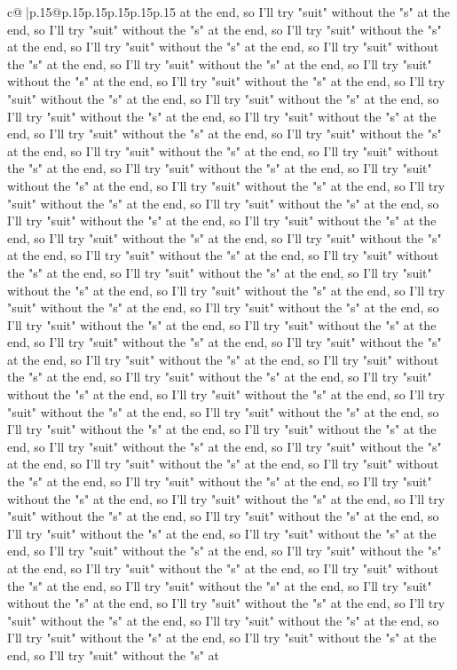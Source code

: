 \documentclass{article}
\begin{document}
{\begin{supertabular}{c@{$\;$}|p{.15\linewidth}@{}p{.15\linewidth}p{.15\linewidth}p{.15\linewidth}p{.15\linewidth}p{.15\linewidth}}
{{{at the end, so I'll try "suit" without the "s" at the end, so I'll try "suit" without the "s" at the end, so I'll try "suit" without the "s" at the end, so I'll try "suit" without the "s" at the end, so I'll try "suit" without the "s" at the end, so I'll try "suit" without the "s" at the end, so I'll try "suit" without the "s" at the end, so I'll try "suit" without the "s" at the end, so I'll try "suit" without the "s" at the end, so I'll try "suit" without the "s" at the end, so I'll try "suit" without the "s" at the end, so I'll try "suit" without the "s" at the end, so I'll try "suit" without the "s" at the end, so I'll try "suit" without the "s" at the end, so I'll try "suit" without the "s" at the end, so I'll try "suit" without the "s" at the end, so I'll try "suit" without the "s" at the end, so I'll try "suit" without the "s" at the end, so I'll try "suit" without the "s" at the end, so I'll try "suit" without the "s" at the end, so I'll try "suit" without the "s" at the end, so I'll try "suit" without the "s" at the end, so I'll try "suit" without the "s" at the end, so I'll try "suit" without the "s" at the end, so I'll try "suit" without the "s" at the end, so I'll try "suit" without the "s" at the end, so I'll try "suit" without the "s" at the end, so I'll try "suit" without the "s" at the end, so I'll try "suit" without the "s" at the end, so I'll try "suit" without the "s" at the end, so I'll try "suit" without the "s" at the end, so I'll try "suit" without the "s" at the end, so I'll try "suit" without the "s" at the end, so I'll try "suit" without the "s" at the end, so I'll try "suit" without the "s" at the end, so I'll try "suit" without the "s" at the end, so I'll try "suit" without the "s" at the end, so I'll try "suit" without the "s" at the end, so I'll try "suit" without the "s" at the end, so I'll try "suit" without the "s" at the end, so I'll try "suit" without the "s" at the end, so I'll try "suit" without the "s" at the end, so I'll try "suit" without the "s" at the end, so I'll try "suit" without the "s" at the end, so I'll try "suit" without the "s" at the end, so I'll try "suit" without the "s" at the end, so I'll try "suit" without the "s" at the end, so I'll try "suit" without the "s" at the end, so I'll try "suit" without the "s" at the end, so I'll try "suit" without the "s" at the end, so I'll try "suit" without the "s" at the end, so I'll try "suit" without the "s" at the end, so I'll try "suit" without the "s" at the end, so I'll try "suit" without the "s" at the end, so I'll try "suit" without the "s" at the end, so I'll try "suit" without the "s" at the end, so I'll try "suit" without the "s" at the end, so I'll try "suit" without the "s" at the end, so I'll try "suit" without the "s" at the end, so I'll try "suit" without the "s" at the end, so I'll try "suit" without the "s" at the end, so I'll try "suit" without the "s" at the end, so I'll try "suit" without the "s" at the end, so I'll try "suit" without the "s" at the end, so I'll try "suit" without the "s" at the end, so I'll try "suit" without the "s" at the end, so I'll try "suit" without the "s" at the end, so I'll try "suit" without the "s" at }}}
\end{supertabular}}
\end{document}
